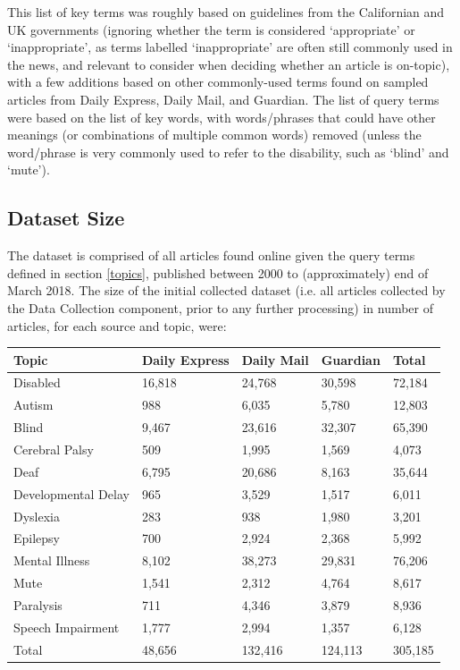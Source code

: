 \documentclass{report}
\begin{document}
This list of key terms was roughly based on guidelines from the Californian \cite{ca-guideline} and UK \cite{uk-guideline} governments (ignoring whether the term is considered `appropriate' or `inappropriate', as terms labelled `inappropriate' are often still commonly used in the news, and relevant to consider when deciding whether an article is on-topic), with a few additions based on other commonly-used terms found on sampled articles from Daily Express, Daily Mail, and Guardian.
The list of query terms were based on the list of key words, with words/phrases that could have other meanings (or combinations of multiple common words) removed (unless the word/phrase is very commonly used to refer to the disability, such as `blind' and `mute').

\subsection{Dataset Size} \label{dataset-size}

The dataset is comprised of all articles found online given the query terms defined in section \ref{topics}, published between 2000 to (approximately) end of March 2018.
The size of the initial collected dataset (i.e. all articles collected by the Data Collection component, prior to any further processing) in number of articles, for each source and topic, were:

\begin{center}
	\begin{tabu} to 1.0\textwidth { | X[c] | X[c] | X[c] | X[c] | X[c] | }
		\hline
		Topic & Daily Express & Daily Mail & Guardian & Total \\
		\hline
		Disabled & 16,818 & 24,768 & 30,598 & 72,184  \\
		\hline
		Autism & 988 & 6,035 & 5,780 & 12,803  \\
		\hline
		Blind & 9,467 & 23,616 & 32,307 & 65,390  \\
		\hline
		Cerebral Palsy & 509 & 1,995 & 1,569 & 4,073  \\
		\hline
		Deaf & 6,795 & 20,686 & 8,163 & 35,644  \\
		\hline
		Developmental Delay & 965 & 3,529 & 1,517 & 6,011  \\
		\hline
		Dyslexia & 283 & 938 & 1,980 & 3,201  \\
		\hline
		Epilepsy & 700 & 2,924 & 2,368 & 5,992  \\
		\hline
		Mental Illness & 8,102 & 38,273 & 29,831 & 76,206  \\
		\hline
		Mute & 1,541 & 2,312 & 4,764 & 8,617  \\
		\hline
		Paralysis & 711 & 4,346 & 3,879 & 8,936  \\
		\hline
		Speech Impairment & 1,777 & 2,994 & 1,357 & 6,128  \\
		\hline
		Total & 48,656 & 132,416 & 124,113 & 305,185  \\
		\hline
	\end{tabu}
\end{center}
\end{document}
